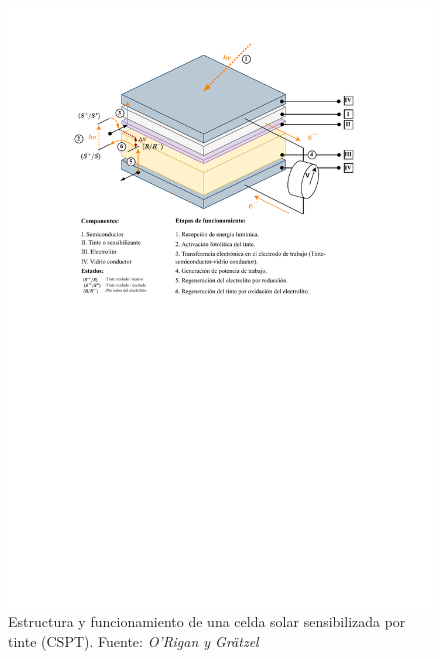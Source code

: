 \begin{figure}[!thb]
    \begin{center}
        \includegraphics[clip, trim=0.5cm 14cm 0.5cm 1cm, width=1.00\textwidth]{img/diagrama_tesis.pdf}
    \end{center}
    \caption{Estructura y funcionamiento de una celda solar sensibilizada por tinte (CSPT). Fuente: \textit{O'Rigan y Grätzel} \cite{o1991low}}
    \label{img:CSPT}
\end{figure}


